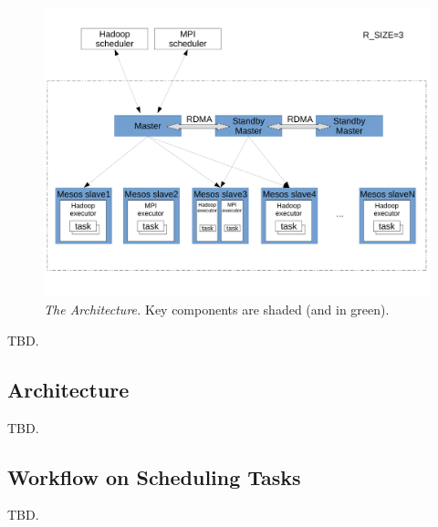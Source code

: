 \begin{figure}[t]
\vspace{.20in}
\centering
\includegraphics[width=.47\textwidth]{figures/arch}
\vspace{.06in}
\caption{{\em The \xxx Architecture.} Key components are shaded (and 
in green).} \label{fig:repbox}
\vspace{-.05in}
\end{figure}


TBD. 

\subsection{Architecture} \label{sec:arch}

TBD. 

\subsection{Workflow on Scheduling Tasks} \label{sec:workflow}

TBD. 

% 


